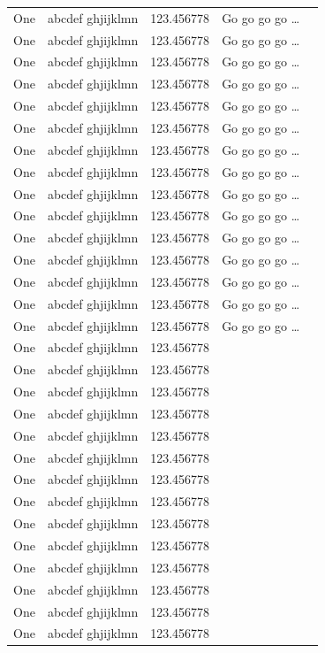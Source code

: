\documentclass[phd,showframe]{ndsu-thesis-2022}
\begin{document}
\begin{spacing}{0.84}
\begin{xltabular}{\textwidth}{l >{\raggedright\arraybackslash}p{0.3\textwidth} X l  >{\raggedleft\arraybackslash}X @{}}
One & abcdef ghjijklmn & 123.456778  & Go go go go \ldots \\
One & abcdef ghjijklmn & 123.456778  & Go go go go \ldots \\
One & abcdef ghjijklmn & 123.456778  & Go go go go \ldots \\
One & abcdef ghjijklmn & 123.456778  & Go go go go \ldots \\
One & abcdef ghjijklmn & 123.456778  & Go go go go \ldots \\
One & abcdef ghjijklmn & 123.456778  & Go go go go \ldots \\
One & abcdef ghjijklmn & 123.456778  & Go go go go \ldots \\
One & abcdef ghjijklmn & 123.456778  & Go go go go \ldots \\
One & abcdef ghjijklmn & 123.456778  & Go go go go \ldots \\
One & abcdef ghjijklmn & 123.456778  & Go go go go \ldots \\
One & abcdef ghjijklmn & 123.456778  & Go go go go \ldots \\
One & abcdef ghjijklmn & 123.456778  & Go go go go \ldots \\
One & abcdef ghjijklmn & 123.456778  & Go go go go \ldots \\
One & abcdef ghjijklmn & 123.456778  & Go go go go \ldots \\
One & abcdef ghjijklmn & 123.456778  & Go go go go \ldots \\
One & abcdef ghjijklmn & 123.456778 \\
One & abcdef ghjijklmn & 123.456778 \\
One & abcdef ghjijklmn & 123.456778 \\
One & abcdef ghjijklmn & 123.456778 \\
One & abcdef ghjijklmn & 123.456778 \\
One & abcdef ghjijklmn & 123.456778 \\
One & abcdef ghjijklmn & 123.456778 \\
One & abcdef ghjijklmn & 123.456778 \\
One & abcdef ghjijklmn & 123.456778 \\
One & abcdef ghjijklmn & 123.456778 \\
One & abcdef ghjijklmn & 123.456778 \\
One & abcdef ghjijklmn & 123.456778 \\
One & abcdef ghjijklmn & 123.456778 \\
One & abcdef ghjijklmn & 123.456778 \\

\end{xltabular}
\end{spacing}
\end{document}
